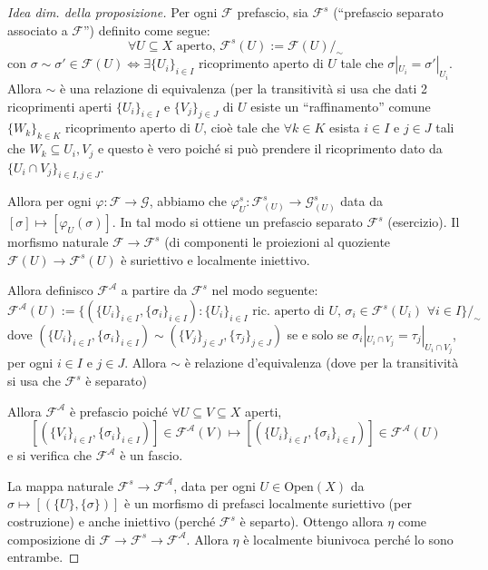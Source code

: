 \begin{proof}[Idea dim. della proposizione]
    Per ogni \(\mathcal{F}\) prefascio, sia \(\mathcal{F}^{s}\) (``prefascio
    separato associato a \(\mathcal{F}\)'') definito come segue:
    \[
      \forall U \subseteq X \text{ aperto, }\mathcal{F}^{s}{(U)} :=
      \mathcal{F}{(U)} /_\sim 
    \]
    con \(\sigma \sim \sigma' \in \mathcal{F}{(U)} \iff \exists \{U_{i}\}_{i \in
    I} \) ricoprimento aperto di \(U\) tale che \(\sigma|_{U_{i}}  =
    \sigma'|_{U_{i}} \). Allora \(\sim \) è una relazione di equivalenza (per la
    transitività si usa che dati 2 ricoprimenti aperti \(\{U_{i}\}_{i \in I} \)
    e \(\{V_{j}\}_{j \in J} \) di \(U\) esiste un ``raffinamento'' comune
    \(\{W_k\}_{k \in K} \) ricoprimento aperto di \(U\), cioè tale che \(\forall
    k \in K\) esista \(i \in I\) e \(j \in J\) tali che \(W_k \subseteq U_{i},
    V_{j} \) e questo è vero poiché si può prendere il ricoprimento dato da
    \(\{U_{i} \cap V_{j}\}_{i \in I, j \in J}\).

    Allora per ogni \(\varphi : \mathcal{F} \to \mathcal{G}\), abbiamo che
    \(\varphi_U^{s} : \mathcal{F}^{s}_{{(U)}} \to \mathcal{G}^{s}_{{(U)}} \)
    data da \([\sigma] \mapsto [\varphi_U{(\sigma)}]\). In tal modo si ottiene
    un prefascio separato \(\mathcal{F}^{s}\) (esercizio). Il morfismo naturale
    \(\mathcal{F} \to \mathcal{F}^{s}\) (di componenti le proiezioni al
    quoziente \(\mathcal{F}{(U)} \to \mathcal{F}^{s}{(U)}\) è suriettivo e
    localmente iniettivo. 

    Allora definisco \(\mathcal{F}^{\mathcal{A}}\) a partire da
    \(\mathcal{F}^{s}\) nel modo seguente:
    \[
      \mathcal{F}^{\mathcal{A}}{(U)} := \{{(\{U_{i}\}_{i \in I} ,
      \{\sigma_{i}\}_{i \in I}  )} : \{U_{i}\}_{i \in I} \text{ ric.
aperto di \(U\), } \sigma_{i} \in \mathcal{F}^{s}{(U_{i})}\,\,\forall i \in I \}/_\sim 
    \] %
    dove \({(\{U_{i}\} _{i \in I} , \{\sigma_{i}\} _{i \in I} )} \sim
    {(\{V_{j}\} _{j \in J} , \{\tau_{j}\} _{j \in J} )}\) se e solo se
    \(\sigma_{i}|_{U_{i} \cap V_{j}} = \tau_{j}|_{U_{i} \cap V_{j}} \), per ogni
    \(i \in I\) e \(j \in J\). Allora \(\sim \) è relazione d'equivalenza (dove
    per la transitività si usa che \(\mathcal{F}^{s}\) è separato)

    Allora \(\mathcal{F}^{\mathcal{A}}\) è prefascio poiché \(\forall U
    \subseteq V \subseteq X  \) aperti, \[[{(\{V_{i}\}_{i \in I}  ,
        \{\sigma_{i}\}_{i \in I} )}] \in
    \mathcal{F}^{\mathcal{A}}{(V)} \mapsto [{(\{U_{i}\}_{i \in I} ,
    \{\sigma_{i}\} _{i \in I} )}] \in
\mathcal{F}^{\mathcal{A}}{(U)}\] e si verifica che \(\mathcal{F}^{\mathcal{A}}\)
è un fascio.

    La mappa naturale \(\mathcal{F}^{s} \to \mathcal{F}^{\mathcal{A}}\), data
    per ogni \(U \in \mathrm{Open}{(X)}\) da \(\sigma \mapsto [{(\{U\} ,
    \{\sigma\} )}]\) è un morfismo di prefasci localmente suriettivo (per
    costruzione) e anche iniettivo (perché \(\mathcal{F}^{s}\) è separto).
    Ottengo allora \(\eta\) come composizione di \(\mathcal{F} \to
    \mathcal{F}^{s} \to \mathcal{F}^{\mathcal{A}}\). Allora \(\eta\) è
    localmente biunivoca perché lo sono entrambe.
\end{proof}

